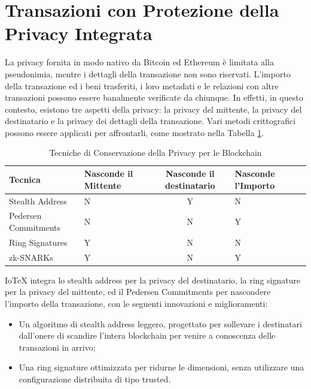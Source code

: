 \section{Transazioni con Protezione della Privacy Integrata}
La privacy fornita in modo nativo da Bitcoin ed Ethereum è limitata alla pseudonimia, mentre i dettagli della transazione non sono riservati. L'importo della transazione ed i beni trasferiti, i loro metadati e le relazioni con altre transazioni possono essere  banalmente verificate da chiunque. In effetti, in questo contesto, esistono tre aspetti della privacy: la privacy del mittente, la privacy del destinatario e la privacy dei dettagli della transazione. Vari metodi crittografici possono essere applicati per affrontarli, come mostrato nella Tabella \ref{table:PrivacyPreservingTechniques}.

\begin{table}[tp]%
	\caption{Tecniche di Conservazione della Privacy per le Blockchain}
	\label{table:PrivacyPreservingTechniques}\centering %
	\begin{tabular}{l|p{2cm}c|p{2.5cm}|p{2cm}}
		\hline
		Tecnica              & Nasconde il Mittente & Nasconde il destinatario & Nasconde l'Importo \\
		\hline
		Stealth Address      & N                    & Y                        & N                  \\
		Pedersen Commitments & N                    & N                        & Y                  \\
		Ring Signatures      & Y                    & N                        & N                  \\
		zk-SNARKs            & Y                    & N                        & Y                  \\
		\hline
	\end{tabular}
\end{table}

IoTeX integra lo stealth address per la privacy del destinatario, la ring signature per la privacy del mittente, ed il Pedersen Commitments per nascondere l'importo della transazione, con le seguenti innovazioni e miglioramenti:

\begin{itemize}
	\item Un algoritmo di stealth address leggero, progettato per sollevare i destinatari dall'onere di scandire l'intera blockchain per venire a conoscenza delle transazioni in arrivo;

	\item Una ring signature ottimizzata per ridurne le dimensioni, senza utilizzare una configurazione distribuita di tipo trusted.
\end{itemize}


